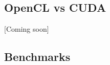 \documentclass{article}
\begin{document}

\subsection{OpenCL vs CUDA}
[Coming soon]





\subsection{Benchmarks}
\end{document}
